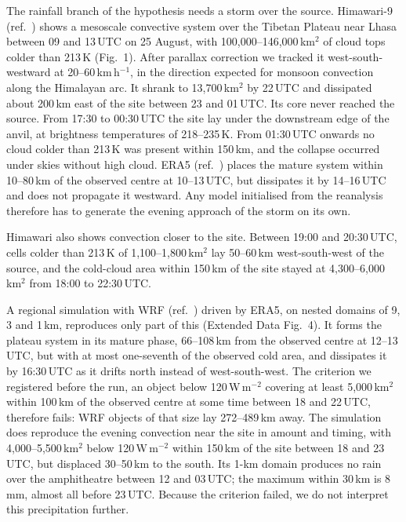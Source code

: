 \documentclass{nature}
\begin{document}
The rainfall branch of the hypothesis needs a storm over the source. Himawari-9 (ref.~) shows a mesoscale convective system\cite{houze2004} over the Tibetan Plateau near Lhasa between 09 and 13\,UTC on 25 August, with 100,000--146,000\,km$^{2}$ of cloud tops colder than 213\,K (Fig.~1). After parallax correction we tracked it west-south-westward at 20--60\,km\,h$^{-1}$, in the direction expected for monsoon convection along the Himalayan arc\cite{houze2007,bookhagen2006}. It shrank to 13,700\,km$^{2}$ by 22\,UTC and dissipated about 200\,km east of the site between 23 and 01\,UTC. Its core never reached the source. From 17:30 to 00:30\,UTC the site lay under the downstream edge of the anvil, at brightness temperatures of 218--235\,K. From 01:30\,UTC onwards no cloud colder than 213\,K was present within 150\,km, and the collapse occurred under skies without high cloud. ERA5 (ref.~) places the mature system within 10--80\,km of the observed centre at 10--13\,UTC, but dissipates it by 14--16\,UTC and does not propagate it westward. Any model initialised from the reanalysis therefore has to generate the evening approach of the storm on its own.

Himawari also shows convection closer to the site. Between 19:00 and 20:30\,UTC, cells colder than 213\,K of 1,100--1,800\,km$^{2}$ lay 50--60\,km west-south-west of the source, and the cold-cloud area within 150\,km of the site stayed at 4,300--6,000\,km$^{2}$ from 18:00 to 22:30\,UTC.

A regional simulation with WRF (ref.~) driven by ERA5, on nested domains of 9, 3 and 1\,km, reproduces only part of this (Extended Data Fig.~4). It forms the plateau system in its mature phase, 66--108\,km from the observed centre at 12--13\,UTC, but with at most one-seventh of the observed cold area, and dissipates it by 16:30\,UTC as it drifts north instead of west-south-west. The criterion we registered before the run, an object below 120\,W\,m$^{-2}$ covering at least 5,000\,km$^{2}$ within 100\,km of the observed centre at some time between 18 and 22\,UTC, therefore fails: WRF objects of that size lay 272--489\,km away. The simulation does reproduce the evening convection near the site in amount and timing, with 4,000--5,500\,km$^{2}$ below 120\,W\,m$^{-2}$ within 150\,km of the site between 18 and 23\,UTC, but displaced 30--50\,km to the south. Its 1-km domain produces no rain over the amphitheatre between 12 and 03\,UTC; the maximum within 30\,km is 8\,mm, almost all before 23\,UTC. Because the criterion failed, we do not interpret this precipitation further.
\end{document}
